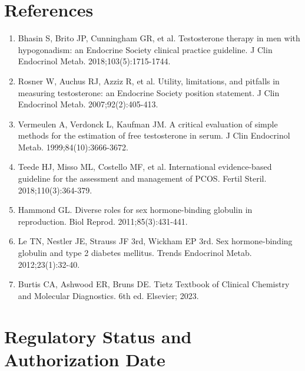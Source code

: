\section*{References}
\begin{enumerate}
  \item Bhasin S, Brito JP, Cunningham GR, et al. Testosterone therapy in men with hypogonadism: an Endocrine Society clinical practice guideline. J Clin Endocrinol Metab. 2018;103(5):1715-1744.
  \item Rosner W, Auchus RJ, Azziz R, et al. Utility, limitations, and pitfalls in measuring testosterone: an Endocrine Society position statement. J Clin Endocrinol Metab. 2007;92(2):405-413.
  \item Vermeulen A, Verdonck L, Kaufman JM. A critical evaluation of simple methods for the estimation of free testosterone in serum. J Clin Endocrinol Metab. 1999;84(10):3666-3672.
  \item Teede HJ, Misso ML, Costello MF, et al. International evidence-based guideline for the assessment and management of PCOS. Fertil Steril. 2018;110(3):364-379.
  \item Hammond GL. Diverse roles for sex hormone-binding globulin in reproduction. Biol Reprod. 2011;85(3):431-441.
  \item Le TN, Nestler JE, Strauss JF 3rd, Wickham EP 3rd. Sex hormone-binding globulin and type 2 diabetes mellitus. Trends Endocrinol Metab. 2012;23(1):32-40.
  \item Burtis CA, Ashwood ER, Bruns DE. Tietz Textbook of Clinical Chemistry and Molecular Diagnostics. 6th ed. Elsevier; 2023.
\end{enumerate}

\clearpage
\section*{Regulatory Status and Authorization Date}

\clearpage
